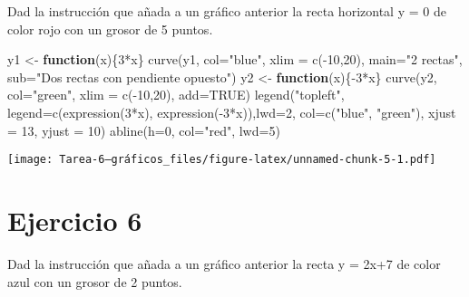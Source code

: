 \documentclass[
]{article}
\newenvironment{Shaded}{\begin{snugshade}}{\end{snugshade}}
\newcommand{\AttributeTok}[1]{\textcolor[rgb]{0.77,0.63,0.00}{#1}}
\newcommand{\ConstantTok}[1]{\textcolor[rgb]{0.00,0.00,0.00}{#1}}
\newcommand{\ControlFlowTok}[1]{\textcolor[rgb]{0.13,0.29,0.53}{\textbf{#1}}}
\newcommand{\DecValTok}[1]{\textcolor[rgb]{0.00,0.00,0.81}{#1}}
\newcommand{\FunctionTok}[1]{\textcolor[rgb]{0.00,0.00,0.00}{#1}}
\newcommand{\NormalTok}[1]{#1}
\newcommand{\OtherTok}[1]{\textcolor[rgb]{0.56,0.35,0.01}{#1}}
\newcommand{\SpecialCharTok}[1]{\textcolor[rgb]{0.00,0.00,0.00}{#1}}
\newcommand{\StringTok}[1]{\textcolor[rgb]{0.31,0.60,0.02}{#1}}
\begin{document}
Dad la instrucción que añada a un gráfico anterior la recta horizontal y
= 0 de color rojo con un grosor de 5 puntos.

\begin{Shaded}
\begin{Highlighting}[]
\NormalTok{y1 }\OtherTok{\textless{}{-}} \ControlFlowTok{function}\NormalTok{(x)\{}\DecValTok{3}\SpecialCharTok{*}\NormalTok{x\}}
\FunctionTok{curve}\NormalTok{(y1, }\AttributeTok{col=}\StringTok{"blue"}\NormalTok{, }\AttributeTok{xlim =} \FunctionTok{c}\NormalTok{(}\SpecialCharTok{{-}}\DecValTok{10}\NormalTok{,}\DecValTok{20}\NormalTok{), }\AttributeTok{main=}\StringTok{"2 rectas"}\NormalTok{, }\AttributeTok{sub=}\StringTok{"Dos rectas con pendiente opuesto"}\NormalTok{)}
\NormalTok{y2 }\OtherTok{\textless{}{-}} \ControlFlowTok{function}\NormalTok{(x)\{}\SpecialCharTok{{-}}\DecValTok{3}\SpecialCharTok{*}\NormalTok{x\}}
\FunctionTok{curve}\NormalTok{(y2, }\AttributeTok{col=}\StringTok{"green"}\NormalTok{, }\AttributeTok{xlim =} \FunctionTok{c}\NormalTok{(}\SpecialCharTok{{-}}\DecValTok{10}\NormalTok{,}\DecValTok{20}\NormalTok{), }\AttributeTok{add=}\ConstantTok{TRUE}\NormalTok{)}
\FunctionTok{legend}\NormalTok{(}\StringTok{"topleft"}\NormalTok{, }\AttributeTok{legend=}\FunctionTok{c}\NormalTok{(}\FunctionTok{expression}\NormalTok{(}\DecValTok{3}\SpecialCharTok{*}\NormalTok{x), }\FunctionTok{expression}\NormalTok{(}\SpecialCharTok{{-}}\DecValTok{3}\SpecialCharTok{*}\NormalTok{x)),}\AttributeTok{lwd=}\DecValTok{2}\NormalTok{, }\AttributeTok{col=}\FunctionTok{c}\NormalTok{(}\StringTok{"blue"}\NormalTok{, }\StringTok{"green"}\NormalTok{), }\AttributeTok{xjust =} \DecValTok{13}\NormalTok{, }\AttributeTok{yjust =} \DecValTok{10}\NormalTok{)}
\FunctionTok{abline}\NormalTok{(}\AttributeTok{h=}\DecValTok{0}\NormalTok{, }\AttributeTok{col=}\StringTok{"red"}\NormalTok{, }\AttributeTok{lwd=}\DecValTok{5}\NormalTok{)}
\end{Highlighting}
\end{Shaded}

\texttt{[image: Tarea-6--gráficos\_files/figure-latex/unnamed-chunk-5-1.pdf]}

\hypertarget{ejercicio-6}{%
\section{Ejercicio 6}\label{ejercicio-6}}

Dad la instrucción que añada a un gráfico anterior la recta y = 2x+7 de
color azul con un grosor de 2 puntos.
\end{document}
